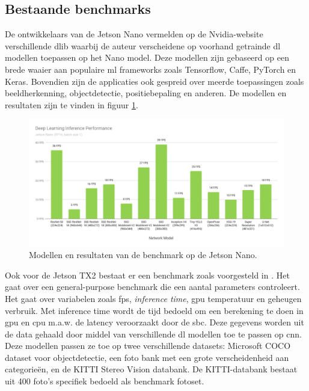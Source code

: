 	\subsection{Bestaande benchmarks}
	De ontwikkelaars van de Jetson Nano vermelden op de Nvidia-website\cite{bron:nanobenchmark} verschillende \gls{dlib} waarbij de auteur verscheidene op voorhand getrainde \gls{dl} modellen toepassen op het Nano model. Deze modellen zijn gebaseerd op een brede waaier aan populaire \gls{ml} frameworks zoals Tensorflow, Caffe, PyTorch en Keras. Bovendien zijn de applicaties ook gespreid over meerde toepassingen zoals beeldherkenning, objectdetectie, positiebepaling en anderen. De modellen en resultaten zijn te vinden in figuur \ref{fig:nanobenchmark}.

	\begin{figure}
		\centering
		\includegraphics{afbeeldingen/NanoBenchmark.png}
		\caption{Modellen en resultaten van de benchmark op de Jetson Nano\cite{bron:nanobenchmark}.}
		\label{fig:nanobenchmark}
	\end{figure}

	Ook voor de Jetson TX2 bestaat er een benchmark zoals voorgesteld in \cite{bordignonbenchmarking}. Het gaat over een general-purpose benchmark die een aantal parameters controleert. Het gaat over variabelen zoals \gls{fps}, \textit{inference time}, \gls{gpu} temperatuur en geheugen verbruik. Met inference time wordt de tijd bedoeld om een berekening te doen in \gls{gpu} en \gls{cpu} m.a.w. de latency veroorzaakt door de \gls{sbc}. Deze gegevens worden uit de data gehaald door middel van verschillende \gls{dl} modellen toe te passen op \gls{cnn}. Deze modellen passen ze toe op twee verschillende datasets: Microsoft COCO dataset voor objectdetectie, een foto bank met een grote verscheidenheid aan categorie\"en, en de KITTI Stereo Vision databank. De KITTI-databank bestaat uit 400 foto's specifiek bedoeld als benchmark fotoset.
	
